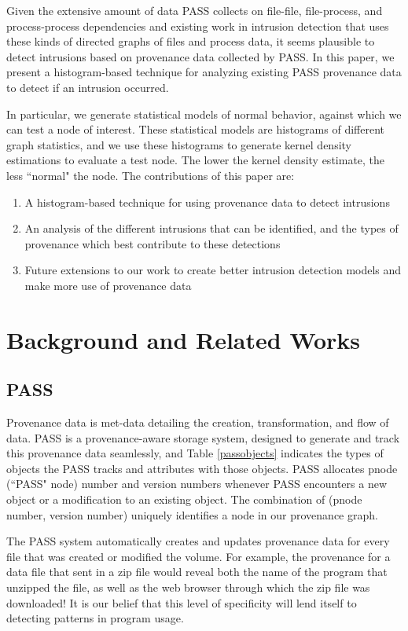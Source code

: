 \documentclass[10pt,twocolumn]{article}
\begin{document}
Given the extensive amount of data PASS collects on file-file, file-process, and process-process dependencies and existing work in intrusion detection that uses these kinds of directed graphs of files and process data, it seems plausible to detect intrusions based on provenance data collected by PASS. In this paper, we present a histogram-based technique for analyzing existing PASS provenance data to detect if an intrusion occurred. 

In particular, we generate statistical models of normal behavior, against which we can test a node of interest. These statistical models are histograms of different graph statistics, and we use these histograms to generate kernel density estimations to evaluate a test node. The lower the kernel density estimate, the less ``normal" the node. The contributions of this paper are:
\begin{enumerate}
\item A histogram-based technique for using provenance data to detect intrusions
\item An analysis of the different intrusions that can be identified, and the types of provenance which best contribute to these detections
\item Future extensions to our work to create better intrusion detection models and make more use of provenance data
\end{enumerate}

\section{Background and Related Works}
\subsection{PASS}
Provenance data is met-data detailing the creation, transformation, and flow of data. PASS \cite{pass, passv2} is a provenance-aware storage system, designed to generate and track this provenance data seamlessly, and Table \ref{passobjects} indicates the types of objects the PASS tracks and attributes with those objects. PASS allocates pnode (``PASS" node) number and version numbers whenever PASS encounters a new object or a modification to an existing object. The combination of (pnode number, version number) uniquely identifies a node in our provenance graph.

The PASS system automatically creates and updates provenance data for every file that was created or modified the volume. For example, the provenance for a data file that sent in a zip file would reveal both the name of the program that unzipped the file, as well as the web browser through which the zip file was downloaded! It is our belief that this level of specificity will lend itself to detecting patterns in program usage.
\end{document}

